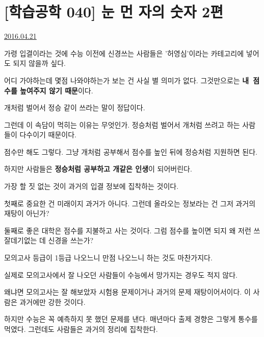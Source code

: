\section{[학습공학 040] 눈 먼 자의 숫자 2편}
\href{https://www.kockoc.com/Apoc/739290}{2016.04.21}

\vspace{5mm}

가령 입결이라는 것에 수능 이전에 신경쓰는 사람들은 '허영심'이라는 카테고리에 넣어도 되지 않을까 싶다.
\vspace{5mm}

어디 가야하는데 몇점 나와야하는가 보는 건 사실 별 의미가 없다. 그것만으로는 \textbf{내 점수를 높여주지 않기 때문}이다.
\vspace{5mm}

개처럼 벌어서 정승 같이 쓰라는 말이 정답이다.
\vspace{5mm}

그런데 이 속담이 먹히는 이유는 무엇인가. 정승처럼 벌어서 개처럼 쓰려고 하는 사람들이 다수이기 때문이다.
\vspace{5mm}

점수만 해도 그렇다. 그냥 개처럼 공부해서 점수를 높인 뒤에 정승처럼 지원하면 된다.
\vspace{5mm}

하지만 사람들은 \textbf{정승처럼 공부하고 개같은 인생}이 되어버린다.
\vspace{5mm}

가장 할 짓 없는 것이 과거의 입결 정보에 집착하는 것이다.
\vspace{5mm}

첫째로 중요한 건 미래이지 과거가 아니다. 그런데 올라오는 정보라는 건 그저 과거의 재탕이 아닌가?
\vspace{5mm}

둘째로 좋은 대학은 점수를 지불하고 사는 것이다. 그럼 점수를 높이면 되지 왜 저런 쓰잘데기없는 데 신경을 쓰는가?
\vspace{5mm}

모의고사 등급이 1등급 나오느니 만점 나오느니 하는 것도 마찬가지다.
\vspace{5mm}

실제로 모의고사에서 잘 나오던 사람들이 수능에서 망가지는 경우도 적지 않다.
\vspace{5mm}

왜냐면 모의고사는 잘 해보았자 시험용 문제이거나 과거의 문제 재탕이어서이다. 이 사람은 과거에만 강한 것이다.
\vspace{5mm}

하지만 수능은 꼭 예측하지 못 했던 문제를 낸다. 매년마다 출제 경향은 그렇게 통수를 먹였다. 그런데도 사람들은 과거의 정리에 집착한다.
\vspace{5mm}

